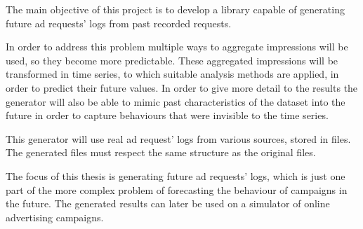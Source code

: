 The main objective of this project is to develop a library capable of generating
future ad requests' logs from past recorded requests.

In order to address this problem multiple ways to aggregate impressions
will be used,
so they become more predictable. These aggregated impressions will be transformed in time
series, to which suitable analysis methods are applied, in order to predict
their future values.
In order to give more detail to the results the generator will also be able to
mimic past characteristics of the dataset into the future in order to capture
behaviours that were invisible to the time series.

This generator will use real ad request' logs from various sources, stored in files.
The generated files must respect the same structure as the original files.

The focus of this thesis is generating future ad requests' logs, which is just
one part of the more complex problem of
forecasting the behaviour of campaigns in the future. The generated results can
later be
used on a simulator of online advertising campaigns.




